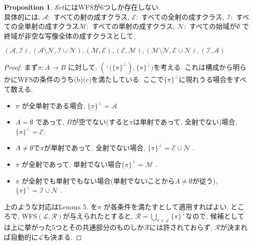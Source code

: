 \documentclass[. /main]{subfiles}
\theoremstyle{definition}
\newtheorem{prop}[theo]{Proposition}
\begin{document}
\begin{prop}
$\mathcal{S}et$にはWFSが6つしか存在しない. \\
具体的には, $\mathcal{A}:$ すべての射の成すクラス, $\mathcal{E}:$ すべての全射の成すクラス, $\mathcal{I}:$ すべての全単射の成すクラス$\mathcal{M}:$ すべての単射の成すクラス, $\mathcal{N}:$ すべての始域が$\emptyset$ で終域が非空な写像全体の成すクラスとして, 
\begin{center} $(\mathcal{A},  \mathcal{I}),  (\mathcal{A} \setminus \mathcal{N},  \mathcal{I} \cup \mathcal{N}),  (\mathcal{M},  \mathcal{E}),  (\mathcal{E},  \mathcal{M}),  (\mathcal{M} \setminus \mathcal{N},  \mathcal{E} \cup \mathcal{N}),  (\mathcal{I},  \mathcal{A})$
\end{center}
\end{prop}
\begin{proof}
まず$\pi \colon A \to B$ に対して, $({{}^{\perp}(\{\pi\}}^{\perp}),  {\{\pi\}}^{\perp})$を考える. これは構成から明らかにWFSの条件のうち(b)(c)を満たしている. ここで${\{\pi\}}^{\perp}$に現れうる場合をすべて数える. 
\begin{itemize}
\item $\pi$ が全単射である場合, ${\{\pi\}}^{\perp}=\mathcal{A}$
\item $A=\emptyset$ であって, $B$が空でない(すると$\pi$は単射であって, 全射でない)場合, ${\{\pi\}}^{\perp}=\mathcal{E}$. 
\item $A \neq \emptyset$で$\pi$が単射であって, 全射でない場合, ${\{\pi\}}^{\perp}=\mathcal{E} \cup \mathcal{N}$ . 
\item $\pi$ が全射であって, 単射でない場合${\{\pi\}}^{\perp}=\mathcal{M}$ . 
\item $\pi$ が全射でも単射でもない場合(単射でないことから$A \neq \emptyset$が従う), ${\{\pi\}}^{\perp}=\mathcal{I} \cup \mathcal{N}$ . 
\end{itemize}
上のような対応はLemma 5. を$\pi$ が各条件を満たすとして適用すればよい. ところで, WFS$(\mathcal{L},  \mathcal{R})$が与えられたとすると, $\mathcal{R}={\bigcup}_{\pi \in \mathcal{L}} {\{\pi\}}^{\perp}$なので, 候補としては上に挙がった5つとその共通部分のものしか$\mathcal{R}$には許されておらず, $\mathcal{R}$が決まれば自動的に$\mathcal{L}$も決まる. 


\end{proof}
\end{document}
